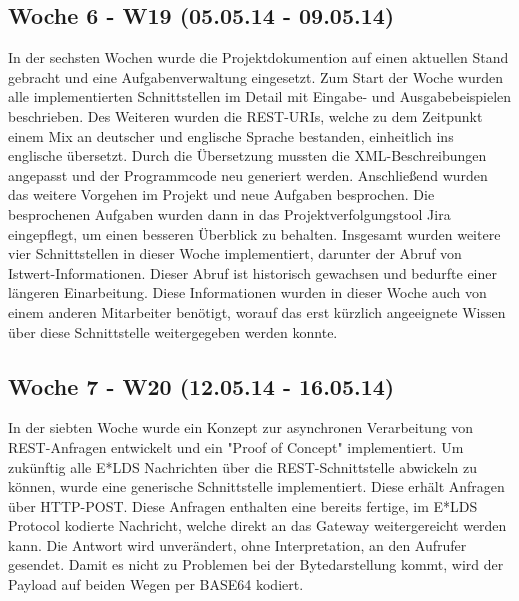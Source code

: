 \documentclass{article}
\begin{document}
\subsection{Woche 6 - W19 (05.05.14 - 09.05.14)}

In der sechsten Wochen wurde die Projektdokumention auf einen aktuellen Stand gebracht und eine Aufgabenverwaltung eingesetzt. Zum Start der Woche wurden alle implementierten Schnittstellen im Detail mit Eingabe- und Ausgabebeispielen beschrieben. Des Weiteren wurden die REST-URIs, welche zu dem Zeitpunkt einem Mix an deutscher und englische Sprache bestanden, einheitlich ins englische übersetzt. Durch die Übersetzung mussten die XML-Beschreibungen angepasst und der Programmcode neu generiert werden. Anschließend wurden das weitere Vorgehen im Projekt und neue Aufgaben besprochen. Die besprochenen Aufgaben wurden dann in das Projektverfolgungstool Jira eingepflegt, um einen besseren Überblick zu behalten. Insgesamt wurden weitere vier Schnittstellen in dieser Woche implementiert, darunter der Abruf von Istwert-Informationen. Dieser Abruf ist historisch gewachsen und bedurfte einer längeren Einarbeitung. Diese Informationen wurden in dieser Woche auch von einem anderen Mitarbeiter benötigt, worauf das erst kürzlich angeeignete Wissen über diese Schnittstelle weitergegeben werden konnte. 

\subsection{Woche 7 - W20 (12.05.14 - 16.05.14)}

In der siebten Woche wurde ein Konzept zur asynchronen Verarbeitung von REST-Anfragen entwickelt und ein "Proof of Concept" implementiert. Um zukünftig alle E*LDS Nachrichten über die REST-Schnittstelle abwickeln zu können, wurde eine generische Schnittstelle implementiert. Diese erhält Anfragen über HTTP-POST. Diese Anfragen enthalten eine bereits fertige, im E*LDS Protocol kodierte Nachricht, welche direkt an das Gateway weitergereicht werden kann. Die Antwort wird unverändert, ohne Interpretation, an den Aufrufer gesendet. Damit es nicht zu Problemen bei der Bytedarstellung kommt, wird der Payload auf beiden Wegen per BASE64 kodiert.
\end{document}
